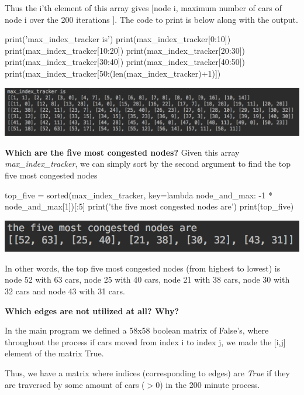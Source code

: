 \documentclass[paper=a4, fontsize=12pt]{scrartcl} %
\numberwithin{equation}{section}       %
\numberwithin{figure}{section}         %
\numberwithin{table}{section}          %
\begin{document}
Thus the i'th element of this array gives [node i, maximum number of cars of node i over the 200 iterations ]. The code to print is below along with the output.

\begin{python}
print('max_index_tracker is')
print(max_index_tracker[0:10])
print(max_index_tracker[10:20])
print(max_index_tracker[20:30])
print(max_index_tracker[30:40])
print(max_index_tracker[40:50])
print(max_index_tracker[50:(len(max_index_tracker)+1)])
\end{python}

\includegraphics[scale=0.7]{max_index.png}
\leavevmode
\newline

\textbf{Which are the five most congested nodes?} \newline
Given this array \textit{max\_index\_tracker}, we can simply sort by the second argument to find the top five most congested nodes
\begin{python}
top_five = sorted(max_index_tracker,
                      key=lambda node_and_max: -1 * node_and_max[1])[:5]
print('the five most congested nodes are')
print(top_five)
\end{python}
\includegraphics{top_five.png}

In other words, the top five most congested nodes (from highest to lowest) is node 52 with 63 cars, node 25 with 40 cars, node 21 with 38 cars, node 30 with 32 cars and node 43 with 31 cars.
\newline


\textbf{Which edges are not utilized at all? Why?}
\leavevmode
\newline

In the main program we defined a 58x58 boolean matrix of False's, where throughout the process if cars moved from index i to index j, we made the [i,j] element of the matrix True.
\leavevmode
\newline

Thus, we have a matrix where indices (corresponding to edges) are \textit{True} if they are traversed by some amount of cars ($ > 0$) in the 200 minute process.
\leavevmode
\newline
\end{document}
